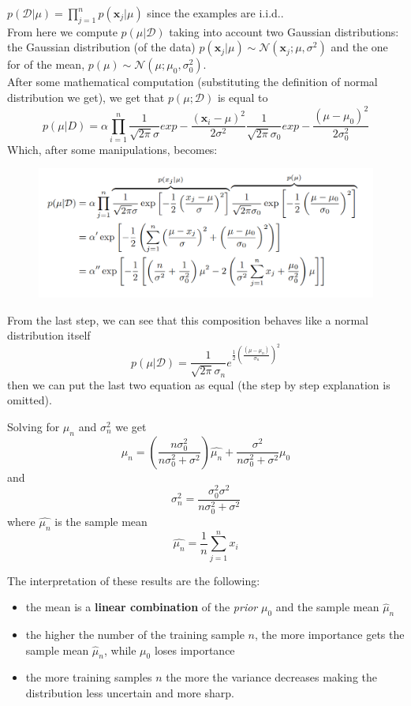     $p(\mathcal{D}|\mu)=\prod_{j=1}^n p(\pmb{x}_j|\mu)$ since the examples are i.i.d..\\
    
    From here we compute $p(\mu|\mathcal{D})$ taking into account two Gaussian distributions: the Gaussian distribution (of the data) $p(\pmb{x}_j | \mu) \sim \mathcal{N}(\pmb{x}_j ; \mu, \sigma^2)$ and the one for of the mean, $p(\mu) \sim \mathcal{N}(\mu ; \mu_0, \sigma_{0}^2)$.\\
    After some mathematical computation (substituting the definition of normal distribution we get), we get that $p(\mu;\mathcal{D})$ is equal to
    $$p(\mu | D) = \alpha \prod_{i=1}^n \frac{1}{\sqrt{2 \pi} \sigma} \mathit{exp} - \frac{(\pmb{x}_i-\mu)^2}{2 \sigma^2} \frac{1}{\sqrt{2 \pi} \sigma_0} \mathit{exp} - \frac{(\mu - \mu_0)^2}{2 \sigma_0^2}$$
    Which, after some manipulations, becomes:
    \begin{figure}[H]
        \centering
        \includegraphics[scale=0.4]{images/bayesian_univariate_gaussian_inter_calculus.png}
    \end{figure}
    From the last step, we can see that this composition behaves like a normal distribution itself
    $$p(\mu|\mathcal{D}) = \frac{1}{\sqrt{2\pi}\sigma_n} e^{\frac{1}{2} (\frac{(\mu - \mu_n)}{\sigma_n})^2}$$
    then we can put the last two equation as equal (the step by step explanation is omitted). 
    
    Solving for $\mu_n$ and $\sigma_n^2$ we get
    $$\mu_n = \left( \frac{n\sigma_0^2}{n\sigma_0^2 + \sigma^2} \right)  \hat{\mu_n} + \frac{\sigma^2}{n\sigma_0^2 + \sigma^2} \mu_0$$
    and
    $$\sigma_n^2 = \frac{\sigma_0^2\sigma^2}{n\sigma_0^2 + \sigma^2}$$
    where $\hat{\mu_n}$ is the sample mean
    $$\hat{\mu_n} = \frac{1}{n} \sum_{j=1}^n x_i$$
    
    The interpretation of these results are the following:
    \begin{itemize}
        \item the mean is a \textbf{linear combination} of the \textit{prior} $\mu_0$ and the sample mean $\hat{\mu}_n$
        \item the higher the number of the training sample $n$, the more importance gets the sample mean $\hat{\mu}_n$, while $\mu_0$ loses importance
        \item the more training samples $n$ the more the variance decreases making the distribution less uncertain and more sharp.
    \end{itemize}
    
